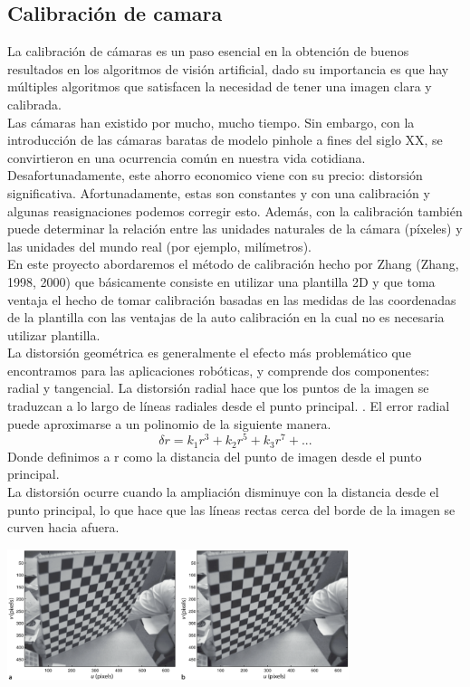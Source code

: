 \subsection{Calibración de camara}
La calibración de cámaras es un paso esencial en la obtención de buenos resultados
en los algoritmos de visión artificial, dado su importancia es que hay múltiples
algoritmos que satisfacen la necesidad de tener una imagen clara y calibrada.\\
Las cámaras han existido por mucho, mucho tiempo. Sin embargo, con la introducción de
las cámaras baratas de modelo pinhole a fines del siglo XX, se convirtieron en una
ocurrencia común en nuestra vida cotidiana. Desafortunadamente, este ahorro economico viene
con su precio: distorsión significativa. Afortunadamente, estas son constantes y con
una calibración y algunas reasignaciones podemos corregir esto. Además,
con la calibración también puede determinar la relación entre las unidades naturales
de la cámara (píxeles) y las unidades del mundo real (por ejemplo, milímetros).\cite{WEB:OpencvCalibracion}\\
En este proyecto abordaremos el método de calibración hecho por Zhang (Zhang, 1998, 2000)
que básicamente consiste en utilizar una plantilla 2D y que toma ventaja el hecho de tomar
calibración basadas en las medidas de
las coordenadas de la plantilla con las ventajas de la
auto calibración en la cual no es necesaria utilizar
plantilla.\\
La distorsión geométrica es generalmente el efecto más problemático que encontramos para las aplicaciones robóticas,
y comprende dos componentes: radial y tangencial. La distorsión radial hace que los puntos de la imagen se
traduzcan a lo largo de líneas radiales desde el punto principal. \cite{Book:Corke2011}. El error radial puede
aproximarse a un polinomio de la siguiente manera.
\begin{equation}
	\delta r = k_1 r^3 + k_2 r^5 + k_3 r^7 + ...
\end{equation}
Donde definimos a r como la distancia del punto de imagen desde el punto principal.\\
La distorsión ocurre cuando la ampliación disminuye con la distancia desde el punto principal, lo que hace
que las líneas rectas cerca del borde de la imagen se curven hacia afuera.
\begin{center}
	\includegraphics[width=0.75\textwidth]{Contenido/Cuerpo/Capitulo2/Fig20.eps}
	\label{fig:MarcoTeorico:Fig19}
\end{center}
